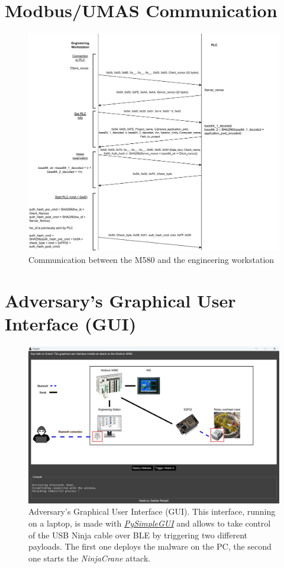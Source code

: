 \chapter{Modbus/UMAS Communication}
\begin{figure}[H]
    \centering
    \vspace{-0.5cm}
    \includegraphics[width=0.95\linewidth]{figures/ModiPwn-Page-1.pdf}
    \caption{Communication between the M580 and the engineering workstation}
    \label{fig:communication}
\end{figure}

\chapter{Adversary's Graphical User Interface (GUI)}
\begin{figure}[H]
    \centering
    \includegraphics[width=\linewidth, angle=00, trim={0cm 0cm 0cm 0cm},clip]{figures/GUI.jpg}
    \caption{Adversary's Graphical User Interface (GUI). This interface, running on a laptop, is made with \href{https://www.pysimplegui.org/en/latest/}{\emph{PySimpleGUI}} and allows to take control of the USB Ninja cable over BLE by triggering two different payloads. The first one deploys the malware on the PC, the second one starts the \emph{NinjaCrane} attack.}
    \label{fig:gui}
\end{figure}

